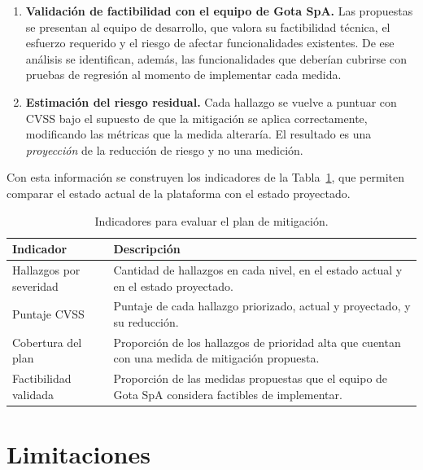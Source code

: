 \documentclass[12pt,letterpaper]{report}
\begin{document}
\begin{enumerate}[leftmargin=1.25cm]
    \item \textbf{Validación de factibilidad con el equipo de Gota SpA.} Las
    propuestas se presentan al equipo de desarrollo, que valora su factibilidad
    técnica, el esfuerzo requerido y el riesgo de afectar funcionalidades
    existentes. De ese análisis se identifican, además, las funcionalidades que
    deberían cubrirse con pruebas de regresión al momento de implementar cada
    medida.
    \item \textbf{Estimación del riesgo residual.} Cada hallazgo se vuelve a
    puntuar con CVSS bajo el supuesto de que la mitigación se aplica
    correctamente, modificando las métricas que la medida alteraría. El
    resultado es una \textit{proyección} de la reducción de riesgo y no una
    medición.
\end{enumerate}

Con esta información se construyen los indicadores de la
Tabla~\ref{tab:indicadores}, que permiten comparar el estado actual de la
plataforma con el estado proyectado.

\begin{table}[htbp]
\centering
\small
\caption{Indicadores para evaluar el plan de mitigación.}
\label{tab:indicadores}
\begin{tabular}{@{}p{5.3cm}p{10.2cm}@{}}
\toprule
\textbf{Indicador} & \textbf{Descripción} \\
\midrule
Hallazgos por severidad & Cantidad de hallazgos en cada nivel, en el estado
actual y en el estado proyectado. \\
\addlinespace
Puntaje CVSS & Puntaje de cada hallazgo priorizado, actual y proyectado, y su
reducción. \\
\addlinespace
Cobertura del plan & Proporción de los hallazgos de prioridad alta que cuentan
con una medida de mitigación propuesta. \\
\addlinespace
Factibilidad validada & Proporción de las medidas propuestas que el equipo de
Gota SpA considera factibles de implementar. \\
\bottomrule
\end{tabular}
\end{table}

\section*{Limitaciones}
\end{document}
